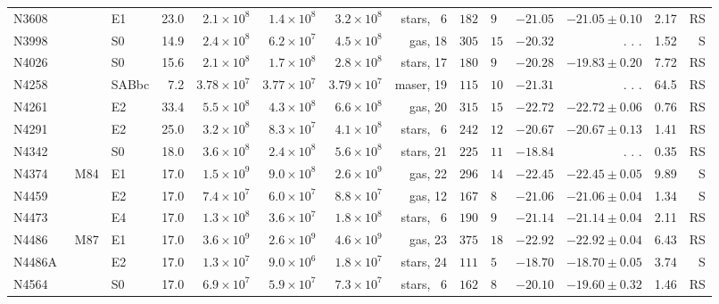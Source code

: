 \documentclass[twosided,letterpaper,numberedappendix]{emulateapj}
\begin{document}
\begin{tabular}{llrrrrrr@{$\pm$}lrrrr}
N3608\tablenotemark{h}       &        E1 &   23.0 & $2.1\times10^{8}$ & $1.4\times10^{8}$ & $3.2\times10^{8}$ & stars, ~6 & $182$&$ 9$ & $-21.05$ & $-21.05 \pm 0.10$ &   2.17 & RS\\
 N3998       &        S0 &   14.9 & $2.4\times10^{8}$ & $6.2\times10^{7}$ & $4.5\times10^{8}$ &   gas, 18 & $305$&$15$ & $-20.32$ &  . . . &   1.52 & ~S\\
 N4026       &        S0 &   15.6 & $2.1\times10^{8}$ & $1.7\times10^{8}$ & $2.8\times10^{8}$ & stars, 17 & $180$&$ 9$ & $-20.28$ & $-19.83 \pm 0.20$ &   7.72 & RS\\
 N4258       &     SABbc &    7.2 & $3.78\times10^{7}$ & $3.77\times10^{7}$ & $3.79\times10^{7}$ & maser, 19 & $115$&$10$ & $-21.31$ &  . . . &   64.5 & RS\\
 N4261       &        E2 &   33.4 & $5.5\times10^{8}$ & $4.3\times10^{8}$ & $6.6\times10^{8}$ &   gas, 20 & $315$&$15$ & $-22.72$ & $-22.72 \pm 0.06$ &   0.76 & RS\\
N4291\tablenotemark{h}       &        E2 &   25.0 & $3.2\times10^{8}$ & $8.3\times10^{7}$ & $4.1\times10^{8}$ & stars, ~6 & $242$&$12$ & $-20.67$ & $-20.67 \pm 0.13$ &   1.41 & RS\\
N4342\tablenotemark{g}       &        S0 &   18.0 & $3.6\times10^{8}$ & $2.4\times10^{8}$ & $5.6\times10^{8}$ & stars, 21 & $225$&$11$ & $-18.84$ &  . . . &   0.35 & RS\\
 N4374\tablenotemark{l} ~~~ M84 &        E1 &   17.0 & $1.5\times10^{9}$ & $9.0\times10^{8}$ & $2.6\times10^{9}$ &   gas, 22 & $296$&$14$ & $-22.45$ & $-22.45 \pm 0.05$ &   9.89 & ~S\\
 N4459\tablenotemark{k}       &        E2 &   17.0 & $7.4\times10^{7}$ & $6.0\times10^{7}$ & $8.8\times10^{7}$ &   gas, 12 & $167$&$ 8$ & $-21.06$ & $-21.06 \pm 0.04$ &   1.34 & ~S\\
N4473\tablenotemark{h}       &        E4 &   17.0 & $1.3\times10^{8}$ & $3.6\times10^{7}$ & $1.8\times10^{8}$ & stars, ~6 & $190$&$ 9$ & $-21.14$ & $-21.14 \pm 0.04$ &   2.11 & RS\\
 N4486 ~~~ M87 &        E1 &   17.0 & $3.6\times10^{9}$ & $2.6\times10^{9}$ & $4.6\times10^{9}$ &   gas, 23 & $375$&$18$ & $-22.92$ & $-22.92 \pm 0.04$ &   6.43 & RS\\
N4486A       &        E2 &   17.0 & $1.3\times10^{7}$ & $9.0\times10^{6}$ & $1.8\times10^{7}$ & stars, 24 & $111$&$ 5$ & $-18.70$ & $-18.70 \pm 0.05$ &   3.74 & ~S\\
N4564\tablenotemark{h}       &        S0 &   17.0 & $6.9\times10^{7}$ & $5.9\times10^{7}$ & $7.3\times10^{7}$ & stars, ~6 & $162$&$ 8$ & $-20.10$ & $-19.60 \pm 0.32$ &   1.46 & RS\\

\end{tabular}
\end{document}
